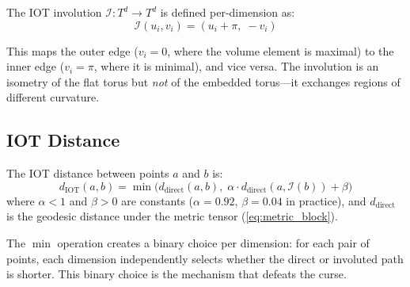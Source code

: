 The IOT involution $\mathcal{I}: T^d \to T^d$ is defined per-dimension as:
\begin{equation}
    \mathcal{I}(u_i, v_i) = (u_i + \pi, \; -v_i)
    \label{eq:involution}
\end{equation}

This maps the outer edge ($v_i = 0$, where the volume element is maximal) to the inner edge ($v_i = \pi$, where it is minimal), and vice versa. The involution is an isometry of the flat torus but \emph{not} of the embedded torus---it exchanges regions of different curvature.

\subsection{IOT Distance}

The IOT distance between points $a$ and $b$ is:
\begin{equation}
    d_{\text{IOT}}(a, b) = \min\!\big(d_{\text{direct}}(a, b), \; \alpha \cdot d_{\text{direct}}(a, \mathcal{I}(b)) + \beta\big)
    \label{eq:iot_distance}
\end{equation}
where $\alpha < 1$ and $\beta > 0$ are constants ($\alpha = 0.92$, $\beta = 0.04$ in practice), and $d_{\text{direct}}$ is the geodesic distance under the metric tensor (\ref{eq:metric_block}).

The $\min$ operation creates a binary choice per dimension: for each pair of points, each dimension independently selects whether the direct or involuted path is shorter. This binary choice is the mechanism that defeats the curse.
